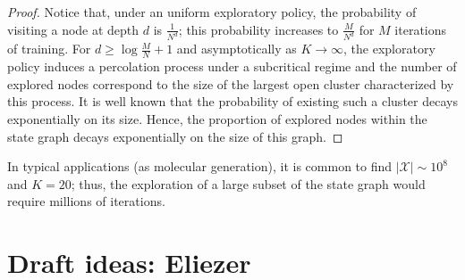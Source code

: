 \documentclass{article} %
\theoremstyle{definition}
\begin{document}
\begin{proof}
    Notice that, under an uniform exploratory policy, the probability of visiting a node at depth $d$ is
    $\frac{1}{N^{d}}$; this probability increases to $\frac{M}{N^{d}}$ for $M$ iterations of training. 
    For $d \ge \log \frac{M}{N} + 1$ and asymptotically as $K \rightarrow \infty$, the exploratory policy induces a
    percolation process under a subcritical regime and the number of explored nodes correspond to the size of the
    largest open cluster characterized by this process. It is well known that the probability of existing such a cluster
    decays exponentially on its size. Hence, the proportion of explored nodes within the state graph decays
    exponentially on the size of this graph.    
\end{proof}



In typical applications (as molecular generation), it is common to find
$|\mathcal{X}| \sim 10^{8}$ and $K = 20$; thus, the exploration of a large subset of the state graph would require
millions of iterations. 

\newpage

\section{Draft ideas: Eliezer}
\end{document}
